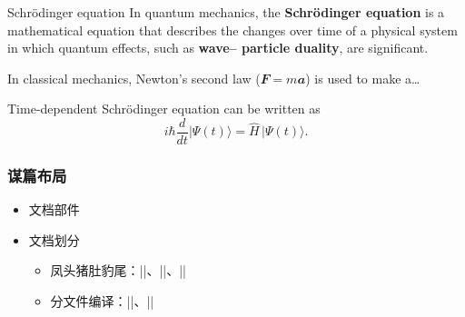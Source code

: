 \begin{frame}{Schrödinger equation}
In quantum mechanics, the \textbf{Schr\"odinger equation} is a
mathematical equation that describes the changes over time of a
physical system in which quantum effects, such as \textbf{wave--%
particle duality}, are significant.

In classical mechanics, Newton's second law
($\mathbfit{F}=m\mathbfit{a}$) is used to make a\ldots{}

Time-dependent Schrödinger equation can be written as
\[ i\hbar \frac{d}{dt} \vert\Psi(t)\rangle = \hat{H} \, \vert\Psi(t)\rangle. \]
\end{frame}

\begin{frame}[fragile]
\frametitle{谋篇布局}
\begin{itemize}
  \item 文档部件


  \item 文档划分

    \begin{itemize}
      \item 凤头猪肚豹尾：|\frontmatter|、|\mainmatter|、|\backmatter|
      \item 分文件编译：||、||
    \end{itemize}
\end{itemize}
\end{frame}

